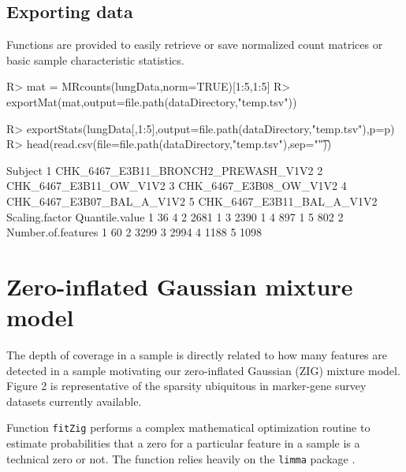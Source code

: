 \documentclass[a4paper,12pt]{article}
\begin{document}
\subsection{Exporting data}
Functions are provided to easily retrieve or save normalized count matrices or basic sample characteristic statistics.

\begin{small}
\begin{Schunk}
\begin{Sinput}
R> mat = MRcounts(lungData,norm=TRUE)[1:5,1:5]
R> exportMat(mat,output=file.path(dataDirectory,"temp.tsv"))
\end{Sinput}
\end{Schunk}
\end{small}

\begin{small}
\begin{Schunk}
\begin{Sinput}
R> exportStats(lungData[,1:5],output=file.path(dataDirectory,"temp.tsv"),p=p)
R> head(read.csv(file=file.path(dataDirectory,"temp.tsv"),sep="\t"))
\end{Sinput}
\begin{Soutput}
                              Subject
1 CHK_6467_E3B11_BRONCH2_PREWASH_V1V2
2              CHK_6467_E3B11_OW_V1V2
3              CHK_6467_E3B08_OW_V1V2
4           CHK_6467_E3B07_BAL_A_V1V2
5           CHK_6467_E3B11_BAL_A_V1V2
  Scaling.factor Quantile.value
1             36              4
2           2681              1
3           2390              1
4            897              1
5            802              2
  Number.of.features
1                 60
2               3299
3               2994
4               1188
5               1098
\end{Soutput}
\end{Schunk}
\end{small}

\section{Zero-inflated Gaussian mixture model}

The depth of coverage in a sample is directly related to how many features are detected in a sample motivating our zero-inflated Gaussian (ZIG) mixture model. Figure 2 is representative of the sparsity ubiquitous in marker-gene survey datasets currently available. 

Function \texttt{fitZig} performs a complex mathematical optimization routine to estimate probabilities that a zero for a particular feature in a sample is a technical zero or not. The function relies heavily on the \texttt{limma} package \cite{limma}.
\end{document}

